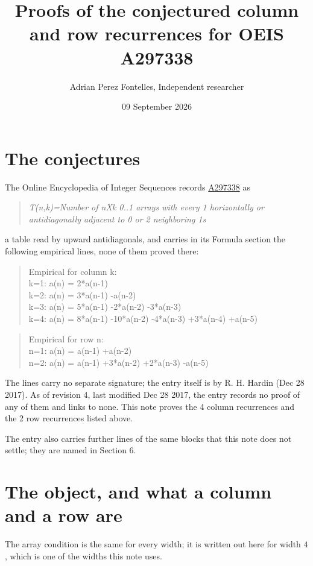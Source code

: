 \documentclass[11pt]{article}
\title{Proofs of the conjectured column and row recurrences for OEIS A297338}
\author{Adrian Perez Fontelles, Independent researcher}
\date{09 September 2026}
\theoremstyle{definition}
\begin{document}
\maketitle
\section{The conjectures}

The Online Encyclopedia of Integer Sequences records \href{https://oeis.org/A297338}{A297338} as

\begin{quote}\itshape T(n,k)=Number of nXk 0..1 arrays with every 1 horizontally or antidiagonally adjacent to 0 or 2 neighboring 1s\end{quote}

a table read by upward antidiagonals, and carries in its Formula section the following empirical lines, none of them proved there:

\begin{quote}\ttfamily Empirical for column k:\\
k=1: a(n) = 2*a(n-1)\\k=2: a(n) = 3*a(n-1) -a(n-2)\\k=3: a(n) = 5*a(n-1) -2*a(n-2) -3*a(n-3)\\k=4: a(n) = 8*a(n-1) -10*a(n-2) -4*a(n-3) +3*a(n-4) +a(n-5)\end{quote}

\begin{quote}\ttfamily Empirical for row n:\\
n=1: a(n) = a(n-1) +a(n-2)\\n=2: a(n) = a(n-1) +3*a(n-2) +2*a(n-3) -a(n-5)\end{quote}

The lines carry no separate signature; the entry itself is by R. H. Hardin (Dec 28 2017). As of revision 4, last modified Dec 28 2017, the entry records no proof of any of them and links to none. This note proves the 4 column recurrences and the 2 row recurrences listed above.

The entry also carries further lines of the same blocks that this note does not settle; they are named in Section 6.

\section{The object, and what a column and a row are}

The array condition is the same for every width; it is written out here for width $4$, which is one of the widths this note uses.
\end{document}
